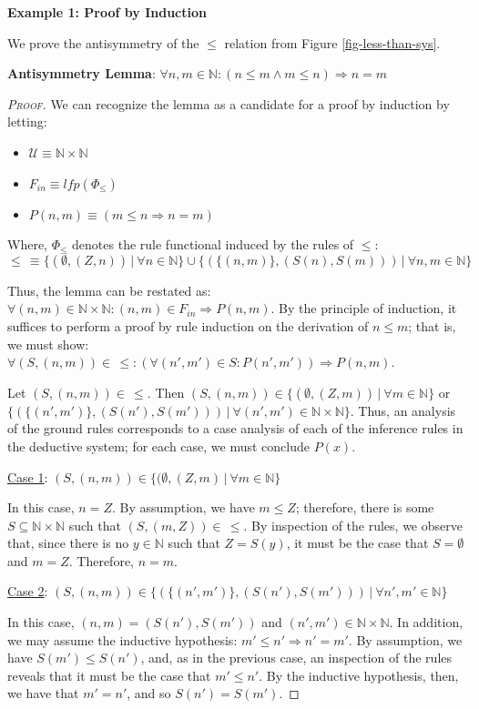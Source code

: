 \textbf{Example 1: Proof by Induction} 

We prove the antisymmetry of the $\le$ relation from Figure \ref{fig-less-than-sys}.

\textbf{Antisymmetry Lemma}: $\forall n, m \in \mathbb{N}: (n \le m \wedge m \le n) \Rightarrow n = m$

\begin{proof}[\textsc{Proof}]

We can recognize the lemma as a candidate for a proof by induction by letting:
\begin{itemize}
\item[] $\mathcal{U} \equiv \mathbb{N} \times \mathbb{N}$
\item[] $F_{in} \equiv lfp(\Phi_{\le})$
\item[] $P(n,m) \equiv (m \le n \Rightarrow n = m)$

\end{itemize}

Where, $\Phi_{\le}$ denotes the rule functional induced by the rules of $\le$: 
$$\le \, \equiv \{ (\emptyset ,(Z,n)) \,|\ \forall n \in \mathbb{N} \} \cup \{ (\{ (n,m) \} , (S(n),S(m))) \,|\ \forall n,m \in \mathbb{N} \}$$

Thus, the lemma can be restated as: $\forall (n,m) \in \mathbb{N} \times \mathbb{N}: (n,m) \in F_{in} \Rightarrow P(n,m)$. By the principle of induction, it suffices to perform a proof by rule induction on the derivation of $n \le m$; that is, we must show: $\forall (S,(n,m)) \in \,\le: (\forall (n',m') \in S: P(n',m')) \Rightarrow P(n,m)$.

Let $(S,(n,m)) \in \, \le$. Then $(S,(n,m)) \in \{ (\emptyset ,(Z,m)) \,|\ \forall m \in \mathbb{N} \}$ or $\{ (\{ (n',m') \} , (S(n'),S(m'))) \,|\ \forall (n',m') \in \mathbb{N} \times \mathbb{N} \}$. Thus, an analysis of the ground rules corresponds to a case analysis of each of the inference rules in the deductive system; for each case, we must conclude $P(x)$.

\underline{Case 1}: $(S,(n,m)) \in \{ (\emptyset, (Z, m) \,|\ \forall m \in \mathbb{N} \}$

In this case, $n = Z$. By assumption, we have $m \le Z$; therefore, there is some $S \subseteq \mathbb{N} \times \mathbb{N}$ such that $(S,(m,Z)) \in \, \le$. By inspection of the rules, we observe that, since there is no $y \in \mathbb{N}$ such that $Z = S(y)$, it must be the case that $S = \emptyset$ and $m = Z$. Therefore, $n = m$.

\underline{Case 2}: $(S,(n,m)) \in \{ (\{ (n',m') \} , (S(n'),S(m'))) \,|\ \forall n',m' \in \mathbb{N} \}$

In this case, $(n,m) = (S(n'),S(m'))$ and $(n',m') \in \mathbb{N} \times \mathbb{N}$. In addition, we may assume the inductive hypothesis: $m' \le n' \Rightarrow n' = m'$. By assumption, we have $S(m') \le S(n')$, and, as in the previous case, an inspection of the rules reveals that it must be the case that $m' \le n'$. By the inductive hypothesis, then, we have that $m' = n'$, and so $S(n') = S(m')$.
\end{proof}

